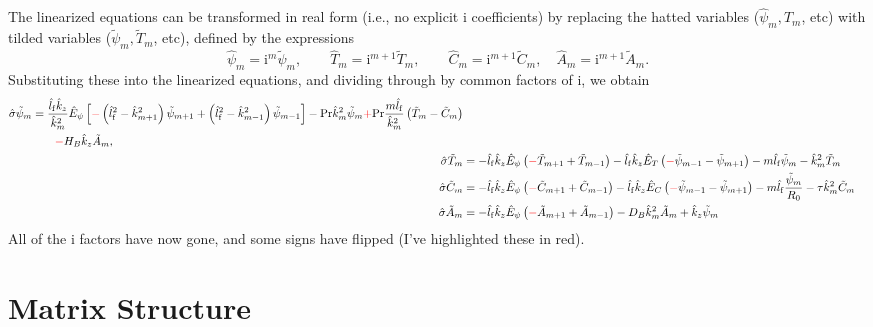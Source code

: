 \documentclass{article}
\newcommand{\shat}{\hat{\sigma}}
\newcommand{\phat}{\hat{\psi}}
\newcommand{\That}{\hat{T}}
\newcommand{\Chat}{\hat{C}}
\newcommand{\Ahat}{\hat{A}}
\newcommand{\ptil}{\tilde{\psi}}
\newcommand{\Ttil}{\tilde{T}}
\newcommand{\Ctil}{\tilde{C}}
\newcommand{\Atil}{\tilde{A}}
\newcommand{\khat}{\hat{k}}
\newcommand{\lhatf}{\hat{l}_{\rm f}}
\newcommand{\Prd}{\mathrm{Pr}}
\newcommand{\Rz}{R_{0}}
\newcommand{\HB}{H_{B}}
\newcommand{\DB}{D_{B}}
\newcommand{\EhatT}{\hat{E}_{T}}
\newcommand{\EhatC}{\hat{E}_{C}}
\newcommand{\Ehatp}{\hat{E}_{\psi}}
\newcommand{\ii}{\mathrm{i}}
\begin{document}
The linearized equations can be transformed in real form (i.e., no
explicit $\ii$ coefficients) by replacing the hatted variables
($\phat_m, \That_m$, etc) with tilded variables ($\ptil_m, \Ttil_m$,
etc), defined by the expressions
%
\begin{equation}
  \phat_m = \ii^m \ptil_m, \qquad
  \That_m = \ii^{m+1} \Ttil_m, \qquad
  \Chat_m = \ii^{m+1} \Ctil_m, \quad
  \Ahat_m = \ii^{m+1} \Atil_m.
\end{equation}
%
Substituting these into the linearized equations, and dividing through
by common factors of $\ii$, we obtain
%
\begin{align}
  \begin{split}
  \shat \ptil_{m} &=
  \frac{\lhatf \khat_z}{\khat^2_m} \Ehatp \left[
    {\color{red}-} \left( \lhatf^2 - \khat^2_{m+1} \right) \ptil_{m+1} 
    + \left( \lhatf^2 - \khat^2_{m-1} \right) \ptil_{m-1}
    \right]
  - \Prd \khat^2_m \ptil_m
  {\color{red}+} \Prd \frac{m \lhatf}{\khat_m^2} \left( \Ttil_m - \Ctil_m \right) \\
  & \qquad {\color{red}-} \HB \khat_z \Atil_m,
  \end{split} \\
  \shat \Ttil_m &=
  - \lhatf \khat_z \Ehatp \left( {\color{red}-} \Ttil_{m+1} + \Ttil_{m-1} \right)
  - \lhatf \khat_z \EhatT \left( {\color{red}-} \ptil_{m-1} - \ptil_{m+1} \right)
  - m \lhatf \ptil_m
  - \khat^2_m \Ttil_m \\
  \shat \Ctil_m &=
  - \lhatf \khat_z \Ehatp \left( {\color{red}-} \Ctil_{m+1} + \Ctil_{m-1} \right)
  - \lhatf \khat_z \EhatC \left( {\color{red}-} \ptil_{m-1} - \ptil_{m+1} \right)
  - m \lhatf \frac{\ptil_m}{\Rz}
  - \tau \khat^2_m \Ctil_m \\
  \shat \Atil_m &=
  - \lhatf \khat_z \Ehatp \left( {\color{red}-} \Atil_{m+1} + \Atil_{m-1} \right)
  - \DB \khat^2_m \Atil_m
  + \khat_z \ptil_m
\end{align}
%
All of the $\ii$ factors have now gone, and some signs have flipped
(I've highlighted these in red).

\section{Matrix Structure}
\end{document}
